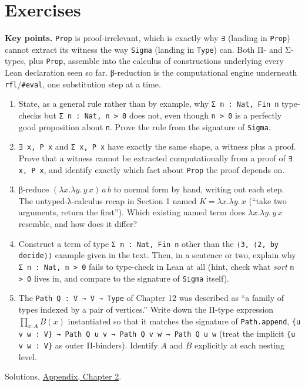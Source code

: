 \section{Exercises}\label{sec:02-terminology-and-coc:03-exercises:1}

\textbf{Key points.} \texttt{Prop} is proof-irrelevant, which is exactly why \texttt{∃} (landing in \texttt{Prop}) cannot extract its witness the way \texttt{Sigma} (landing in \texttt{Type}) can. Both Π- and Σ-types, plus \texttt{Prop}, assemble into the calculus of constructions underlying every Lean declaration seen so far. β-reduction is the computational engine underneath \texttt{rfl}/\texttt{\#eval}, one substitution step at a time.

\begin{enumerate}
\def\labelenumi{\arabic{enumi}.}
\tightlist
\item
  State, as a general rule rather than by example, why \texttt{Σ n : Nat, Fin n} type-checks but \texttt{Σ n : Nat, n > 0} does not, even though \texttt{n > 0} is a perfectly good proposition about \texttt{n}. Prove the rule from the signature of \texttt{Sigma}.
\item
  \texttt{∃ x, P x} and \texttt{Σ x, P x} have exactly the same shape, a witness plus a proof. Prove that a witness cannot be extracted computationally from a proof of \texttt{∃ x, P x}, and identify exactly which fact about \texttt{Prop} the proof depends on.
\item
  β-reduce \((\lambda x.\lambda y.\, y\, x)\, a\, b\) to normal form by hand, writing out each step. The untyped-λ-calculus recap in Section 1 named \(K = \lambda x.\lambda y.\, x\) (``take two arguments, return the first''). Which existing named term does \(\lambda x.\lambda y.\, y\, x\) resemble, and how does it differ?
\item
  Construct a term of type \texttt{Σ n : Nat, Fin n} other than the \texttt{⟨3, ⟨2, by decide⟩⟩} example given in the text. Then, in a sentence or two, explain why \texttt{Σ n : Nat, n > 0} fails to type-check in Lean at all (hint, check what \emph{sort} \texttt{n > 0} lives in, and compare to the signature of \texttt{Sigma} itself).
\item
  The \texttt{Path Q : V → V → Type} of Chapter 12 was described as ``a family of types indexed by a pair of vertices.'' Write down the Π-type expression \(\prod_{x:A} B(x)\) instantiated so that it matches the signature of \texttt{Path.append}, \texttt{\{u v w : V\} → Path Q u v → Path Q v w → Path Q u w} (treat the implicit \texttt{\{u v w : V\}} as outer Π-binders). Identify \(A\) and \(B\) explicitly at each nesting level.
\end{enumerate}

Solutions, \hyperref[sec:15-appendix-solutions:02-chapter-2:1]{Appendix, Chapter 2}.
